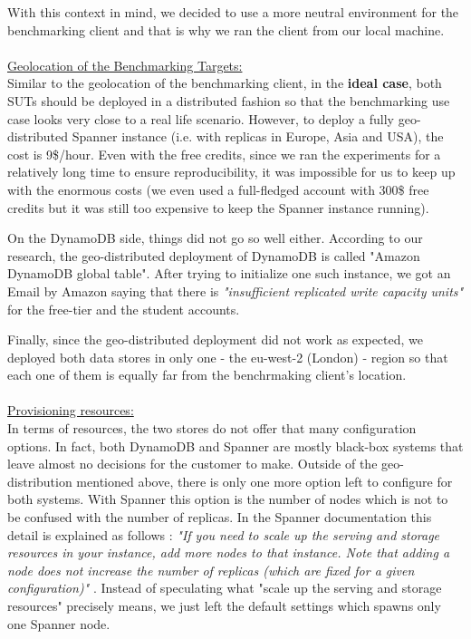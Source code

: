 \documentclass[letterpaper, 10 pt, conference]{ieeeconf}  %
\begin{document}
With this context in mind, we decided to use a more neutral environment for the benchmarking client and that is why we ran the client from our local machine.
\\
\\
\underline{Geolocation of the Benchmarking Targets:}
\\
Similar to the geolocation of the benchmarking client, in the \textbf{ideal case}, both SUTs should be deployed in a distributed fashion so that the benchmarking use case looks very close to a real life scenario. However, to deploy a fully geo-distributed Spanner instance (i.e. with replicas in Europe, Asia and USA), the cost is 9\$/hour. Even with the free credits, since we ran the experiments for a relatively long time to ensure reproducibility, it was impossible for us to keep up with the enormous costs (we even used a full-fledged account with 300\$ free credits but it was still too expensive to keep the Spanner instance running). \par
On the DynamoDB side, things did not go so well either. According to our research, the geo-distributed deployment of DynamoDB is called "Amazon DynamoDB global table". After trying to initialize one such instance, we got an Email by Amazon saying that there is \textit{"insufficient replicated write capacity units"} for the free-tier and the student accounts. \par 
Finally, since the geo-distributed deployment did not work as expected, we deployed both data stores in only one -  the eu-west-2 (London) - region so that each one of them is equally far from the benchrmaking client's location.
\\
\\
\underline{Provisioning resources:}
\\
In terms of resources, the two stores do not offer that many configuration options. In fact, both DynamoDB and Spanner are mostly black-box systems that leave almost no decisions for the customer to make. Outside of the geo-distribution mentioned above, there is only one more option left to configure for both systems. With Spanner this option is the number of nodes which is not to be confused with the number of replicas. In the Spanner documentation this detail is explained as follows : \textit{"If you need to scale up the serving and storage resources in your instance, add more nodes to that instance. Note that adding a node does not increase the number of replicas (which are fixed for a given configuration)"} \cite{SpannerInstances}. Instead of speculating what "scale up the serving and storage resources" precisely means, we just left the default settings which spawns only one Spanner node. \par 
\end{document}
